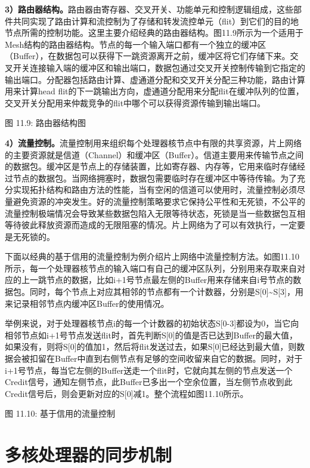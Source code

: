 \documentclass[]{ctexbook}
\begin{document}
\textbf{3）路由器结构。}路由器由寄存器、交叉开关、功能单元和控制逻辑组成，这些部件共同实现了路由计算和流控制为了存储和转发流控单元（flit）到它们的目的地节点所需的控制功能。这里主要介绍经典的路由器结构。图11.9所示为一个适用于Mesh结构的路由器结构。节点的每一个输入端口都有一个独立的缓冲区（Buffer），在数据包可以获得下一跳资源离开之前，缓冲区将它们存储下来。交叉开关连接输入端的缓冲区和输出端口，数据包通过交叉开关控制传输到它指定的输出端口。分配器包括路由计算、虚通道分配和交叉开关分配三种功能，路由计算用来计算head flit的下一跳输出方向，虚通道分配用来分配flit在缓冲队列的位置，交叉开关分配用来仲裁竞争的flit中哪个可以获得资源传输到输出端口。

图 11.9: 路由器结构图

\textbf{4）流量控制。}流量控制用来组织每个处理器核节点中有限的共享资源，片上网络的主要资源就是信道（Channel）和缓冲区（Buffer）。信道主要用来传输节点之间的数据包。缓冲区是节点上的存储装置，比如寄存器、内存等，它用来临时存储经过节点的数据包。当网络拥塞时，数据包需要临时存在缓冲区中等待传输。为了充分实现拓扑结构和路由方法的性能，当有空闲的信道可以使用时，流量控制必须尽量避免资源的冲突发生。好的流量控制策略要求它保持公平性和无死锁，不公平的流量控制极端情况会导致某些数据包陷入无限等待状态，死锁是当一些数据包互相等待彼此释放资源而造成的无限阻塞的情况。片上网络为了可以有效执行，一定要是无死锁的。

下面以经典的基于信用的流量控制为例介绍片上网络中流量控制方法。如图11.10所示，每一个处理器核节点的输入端口有自己的缓冲区队列，分别用来存取来自对应的上一跳节点的数据，比如i+1号节点最左侧的Buffer用来存储来自i号节点的数据包。同时，每个节点上对应其相邻的节点都有一个计数器，分别是S{[}0{]}\textasciitilde S{[}3{]}，用来记录相邻节点内缓冲区Buffer的使用情况。

举例来说，对于处理器核节点i的每一个计数器的初始状态S{[}0-3{]}都设为0，当它向相邻节点如i+1号节点发送flit时，首先判断S{[}0{]}的值是否已达到Buffer的最大值，如果没有，则将S{[}0{]}的值加1，然后将flit发送过去，如果S{[}0{]}已经达到最大值，则数据会被扣留在Buffer中直到右侧节点有足够的空间收留来自它的数据。同时，对于i+1号节点，每当它左侧的Buffer送走一个flit时，它就向其左侧的节点发送一个Credit信号，通知左侧节点，此Buffer已多出一个空余位置，当左侧节点收到此Credit信号后，则会更新对应的S{[}0{]}减1。整个流程如图11.10所示。

图 11.10: 基于信用的流量控制

\hypertarget{ux591aux6838ux5904ux7406ux5668ux7684ux540cux6b65ux673aux5236}{%
\section{多核处理器的同步机制}\label{ux591aux6838ux5904ux7406ux5668ux7684ux540cux6b65ux673aux5236}}
\end{document}
